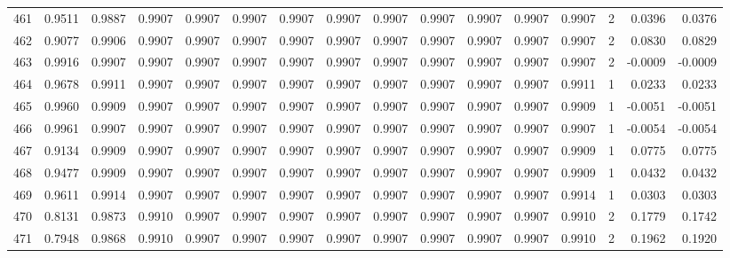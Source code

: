 \begin{tabular}{lrrrrrrrrrrrrrrr}
461 &      0.9511 &  0.9887 &  0.9907 &  0.9907 &  0.9907 &  0.9907 &  0.9907 &  0.9907 &  0.9907 &  0.9907 &   0.9907 &     0.9907 &      2 &                    0.0396 &                     0.0376 \\
462 &      0.9077 &  0.9906 &  0.9907 &  0.9907 &  0.9907 &  0.9907 &  0.9907 &  0.9907 &  0.9907 &  0.9907 &   0.9907 &     0.9907 &      2 &                    0.0830 &                     0.0829 \\
463 &      0.9916 &  0.9907 &  0.9907 &  0.9907 &  0.9907 &  0.9907 &  0.9907 &  0.9907 &  0.9907 &  0.9907 &   0.9907 &     0.9907 &      2 &                   -0.0009 &                    -0.0009 \\
464 &      0.9678 &  0.9911 &  0.9907 &  0.9907 &  0.9907 &  0.9907 &  0.9907 &  0.9907 &  0.9907 &  0.9907 &   0.9907 &     0.9911 &      1 &                    0.0233 &                     0.0233 \\
465 &      0.9960 &  0.9909 &  0.9907 &  0.9907 &  0.9907 &  0.9907 &  0.9907 &  0.9907 &  0.9907 &  0.9907 &   0.9907 &     0.9909 &      1 &                   -0.0051 &                    -0.0051 \\
466 &      0.9961 &  0.9907 &  0.9907 &  0.9907 &  0.9907 &  0.9907 &  0.9907 &  0.9907 &  0.9907 &  0.9907 &   0.9907 &     0.9907 &      1 &                   -0.0054 &                    -0.0054 \\
467 &      0.9134 &  0.9909 &  0.9907 &  0.9907 &  0.9907 &  0.9907 &  0.9907 &  0.9907 &  0.9907 &  0.9907 &   0.9907 &     0.9909 &      1 &                    0.0775 &                     0.0775 \\
468 &      0.9477 &  0.9909 &  0.9907 &  0.9907 &  0.9907 &  0.9907 &  0.9907 &  0.9907 &  0.9907 &  0.9907 &   0.9907 &     0.9909 &      1 &                    0.0432 &                     0.0432 \\
469 &      0.9611 &  0.9914 &  0.9907 &  0.9907 &  0.9907 &  0.9907 &  0.9907 &  0.9907 &  0.9907 &  0.9907 &   0.9907 &     0.9914 &      1 &                    0.0303 &                     0.0303 \\
470 &      0.8131 &  0.9873 &  0.9910 &  0.9907 &  0.9907 &  0.9907 &  0.9907 &  0.9907 &  0.9907 &  0.9907 &   0.9907 &     0.9910 &      2 &                    0.1779 &                     0.1742 \\
471 &      0.7948 &  0.9868 &  0.9910 &  0.9907 &  0.9907 &  0.9907 &  0.9907 &  0.9907 &  0.9907 &  0.9907 &   0.9907 &     0.9910 &      2 &                    0.1962 &                     0.1920 \\

\end{tabular}
